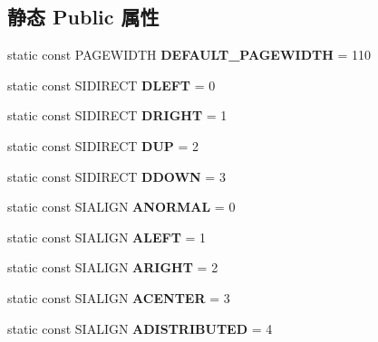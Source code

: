 \subsection*{静态 Public 属性}
\begin{DoxyCompactItemize}
\item 
\mbox{\label{class_s_i_t_e_x_t_ad4c4ba4c15b734d5038ae82f038779f1}} 
static const P\+A\+G\+E\+W\+I\+D\+TH {\bfseries D\+E\+F\+A\+U\+L\+T\+\_\+\+P\+A\+G\+E\+W\+I\+D\+TH} = 110
\item 
\mbox{\label{class_s_i_t_e_x_t_acd47e2cd990b809fd5b3df970f25eda3}} 
static const S\+I\+D\+I\+R\+E\+CT {\bfseries D\+L\+E\+FT} = 0
\item 
\mbox{\label{class_s_i_t_e_x_t_ac683b6b1392ce822739d6babb5c29b85}} 
static const S\+I\+D\+I\+R\+E\+CT {\bfseries D\+R\+I\+G\+HT} = 1
\item 
\mbox{\label{class_s_i_t_e_x_t_a9cdedd80b9b3c3004f358c84cf48eead}} 
static const S\+I\+D\+I\+R\+E\+CT {\bfseries D\+UP} = 2
\item 
\mbox{\label{class_s_i_t_e_x_t_a4f9934231fee1aa7f8dbfe99a3445b00}} 
static const S\+I\+D\+I\+R\+E\+CT {\bfseries D\+D\+O\+WN} = 3
\item 
\mbox{\label{class_s_i_t_e_x_t_a70ee6d49ffd606c7ec5630405e40e9cc}} 
static const S\+I\+A\+L\+I\+GN {\bfseries A\+N\+O\+R\+M\+AL} = 0
\item 
\mbox{\label{class_s_i_t_e_x_t_ae6b33fa9357761a024a62610768c0eba}} 
static const S\+I\+A\+L\+I\+GN {\bfseries A\+L\+E\+FT} = 1
\item 
\mbox{\label{class_s_i_t_e_x_t_a434d89edad0962a98947b25ac6f4ae00}} 
static const S\+I\+A\+L\+I\+GN {\bfseries A\+R\+I\+G\+HT} = 2
\item 
\mbox{\label{class_s_i_t_e_x_t_a9689bfe5dd5cf248de2f6ae14981034e}} 
static const S\+I\+A\+L\+I\+GN {\bfseries A\+C\+E\+N\+T\+ER} = 3
\item 
\mbox{\label{class_s_i_t_e_x_t_a2e657aa73d2793472e6179a05ed4c40c}} 
static const S\+I\+A\+L\+I\+GN {\bfseries A\+D\+I\+S\+T\+R\+I\+B\+U\+T\+ED} = 4
\end{DoxyCompactItemize}
